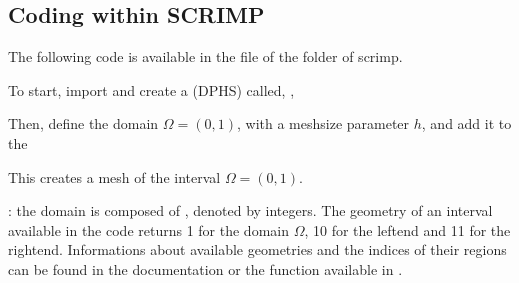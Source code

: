 \documentclass[letterpaper,10pt,english]{sphinxmanual}
\begin{document}
\subsection{Coding within SCRIMP}
\label{\detokenize{started:coding-within-scrimp}}
\sphinxAtStartPar
The following code is available in the file  of the
 folder of scrimp.

\sphinxAtStartPar
To start, import  and create a  (DPHS) called, , 

\begin{sphinxVerbatim}[commandchars=\\\{\}]

  
\end{sphinxVerbatim}

\sphinxAtStartPar
Then, define the domain \(\Omega = (0,1)\), with a mesh\sphinxhyphen{}size
parameter \(h\), and add it to the 

\begin{sphinxVerbatim}[commandchars=\\\{\}]
      
\end{sphinxVerbatim}

\sphinxAtStartPar
This creates a mesh of the interval \(\Omega = (0,1)\).

\sphinxAtStartPar
{}: the domain is composed of ,
denoted by integers. The  geometry of an interval available in
the code returns 1 for the domain \(\Omega\), 10 for the left\sphinxhyphen{}end
and 11 for the right\sphinxhyphen{}end. Informations about available geometries and
the indices of their regions can be found in the documentation or 
the function  available in
.
\end{document}
